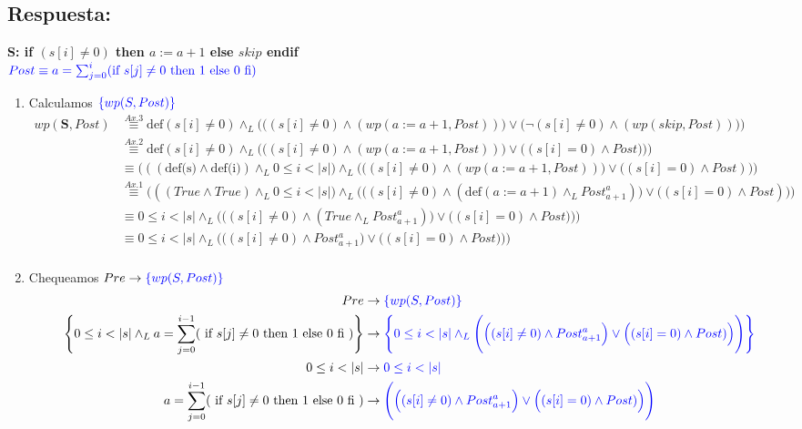\documentclass[a4paper]{article}
\begin{document}
\subsection*{Respuesta:}
\textbf{S: if $( s[i]\neq 0)$ then $a := a+1$ else $skip$ endif}\\
\hspace*{24mm}$\color{blue}Post \equiv a=\sum_{j=0}^{i}(\textrm{if }s[j] \neq 0
    \textrm{ then 1 else 0 fi})$\\
\begin{enumerate}

\item Calculamos $\color{blue}\{wp(S,Post)\}$
		\begin{align*}
		wp(\textbf{S},Post)&\stackrel{Ax.3}{\equiv} \textrm{def}(s[i]\neq 0)\wedge_L 
   					\Bigg(\Big((s[i]\neq 0)\wedge (wp(a:=a+1,Post))\Big) 
   					\vee \Big(\neg(s[i]\neq 0)\wedge (wp(skip,Post))\Big)\Bigg)\\
   			&\stackrel{Ax.2}{\equiv}  \textrm{def}(s[i]\neq 0)\wedge_L 
   				\Bigg(\Big((s[i]\neq 0)\wedge (wp(a:=a+1,Post))\Big) 
   				\vee \Big((s[i] = 0)\wedge Post)\Big)\Bigg)\\
   			&\equiv \Big(((\textrm{def(s)}\wedge
				 \textrm{def(i)})\wedge_L 0\leq i<|s|\Big)\wedge_L 
   				\Bigg(\Big((s[i]\neq 0)\wedge (wp(a:=a+1,Post))\Big) 
   				\vee \Big((s[i] = 0)\wedge Post)\Big)\Bigg)\\  
   			&\stackrel{Ax.1}{\equiv} \Big(((True\wedge
				 True)\wedge_L 0\leq i<|s|\Big)\wedge_L 
   				\Bigg(\Big((s[i]\neq 0)\wedge (\textrm{def}(a:=a+1)\wedge_L
   					Post_{a+1}^{a})\Big) \vee \Big((s[i] = 0)\wedge Post)\Big)\Bigg)\\
   			&\equiv  0\leq i<|s|\wedge_L 
   				\Bigg(\Big((s[i]\neq 0)\wedge (True \wedge_L
   					Post_{a+1}^{a})\Big) \vee \Big((s[i] = 0)\wedge Post)\Big)\Bigg)\\
   			&\equiv  0\leq i<|s|\wedge_L 
   				\Bigg(\Big((s[i]\neq 0)\wedge
   					Post_{a+1}^{a}\Big) \vee \Big((s[i] = 0)\wedge Post)\Big)\Bigg)\\ 									
		\end{align*}
\item Chequeamos $Pre \rightarrow \color{blue}\{wp(S,Post)\}$		
		\begin{align*}
		Pre &\rightarrow \color{blue}\{wp(S,Post)\}\\
		\Bigg\{0 \leq i < |s| \wedge_L a=\sum_{j=0}^{i-1}(\textrm{ if }s[j] \neq 0 
    \textrm{ then 1 else 0 fi })\Bigg\} &\rightarrow  \color{blue}\Bigg\{0\leq i<|s|\wedge_L 
   			\Bigg(\Big((s[i]\neq 0)\wedge
   				Post_{a+1}^{a}\Big) \vee \Big((s[i] = 0)\wedge Post)\Big)\Bigg)\Bigg\}\\
   			0 \leq i < |s| &\rightarrow \color{blue} 0\leq i<|s|\\
   			a=\sum_{j=0}^{i-1}(\textrm{ if }s[j] \neq 0 
    \textrm{ then 1 else 0 fi }) &\rightarrow \color{blue} \Bigg(\Big((s[i]\neq 0)\wedge
   				Post_{a+1}^{a}\Big) \vee \Big((s[i] = 0)\wedge Post)\Big)\Bigg)\\
   		\end{align*}


\end{enumerate}
\end{document}
